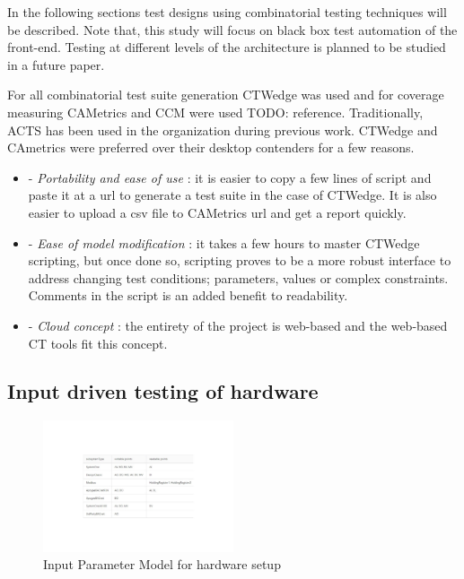 \documentclass[conference]{IEEEtran}
\newcommand{\todo}[1]{}
\renewcommand{\todo}[1]{{\color{red} TODO: {#1}}}
\begin{document}
	In the following sections test designs using combinatorial testing techniques will be described. 
	Note that, this study will focus on black box test automation of the front-end. Testing at different levels of the architecture is planned to be studied in a future paper.

	For all combinatorial test suite generation CTWedge was used and for coverage measuring CAMetrics and CCM were used \todo{reference}.
	Traditionally, ACTS has been used in the organization during previous work.
	CTWedge and CAmetrics were preferred over their desktop contenders for a few reasons.

	\begin{itemize}
		\item [] - \textit{Portability and ease of use} : it is easier to copy a few lines of script and paste it at a url to generate a test suite in the case of CTWedge. It is also easier to upload a csv file to CAMetrics url and get a report quickly.
		\item [] - \textit{Ease of model modification} : it takes a few hours to master CTWedge scripting, but once done so, scripting proves to be a more robust interface to address changing test conditions; parameters, values or complex constraints. Comments in the script is an added benefit to readability. 
		\item [] - \textit{Cloud concept} : the entirety of the project is web-based and the web-based CT tools fit this concept.
	\end{itemize}
	
	\subsection{Input driven testing of hardware}

	\begin{figure}[!t]
		\includegraphics[width=0.50\textwidth,]{commandingIPM.pdf}
		\caption{Input Parameter Model for hardware setup}
		\label{fig:commandingIPM}
	\end{figure}
\end{document}

